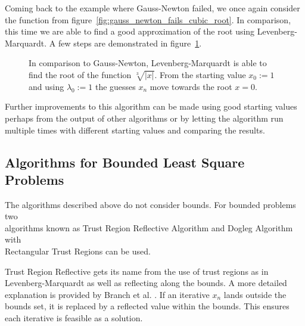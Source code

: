 Coming back to the example where Gauss-Newton failed, we once again consider the function from figure~\ref{fig:gauss_newton_fails_cubic_root}. In comparison, this time we are able to find a good approximation of the root using Levenberg-Marquardt. A few steps are demonstrated in figure~\ref{fig:levenberg-marquardt-example}.

\begin{figure}[h]
	\centering
	\caption{In comparison to Gauss-Newton, Levenberg-Marquardt is able to find the root of the function $\sqrt[3]{|x|}$. From the starting value $x_0 := 1$ and using $\lambda_0 := 1$ the guesses $x_n$ move towards the root $x=0$.}
	\label{fig:levenberg-marquardt-example}
\end{figure}

Further improvements to this algorithm can be made using good starting values perhaps from the output of other algorithms or by letting the algorithm run multiple times with different starting values and comparing the results.

\subsection{Algorithms for Bounded Least Square Problems}
\label{subsec:algorithms_bounded_lsp}

The algorithms described above do not consider bounds. For bounded problems two\\ algorithms known as Trust Region Reflective Algorithm and Dogleg Algorithm with\\ Rectangular Trust Regions can be used.

Trust Region Reflective gets its name from the use of trust regions as in Levenberg-Marquardt as well as reflecting along the bounds. A more detailed explanation is provided by Branch et al. \cite{branch1999}. If an iterative $x_n$ lands outside the bounds set, it is replaced by a reflected value within the bounds. This ensures each iterative is feasible as a solution.

